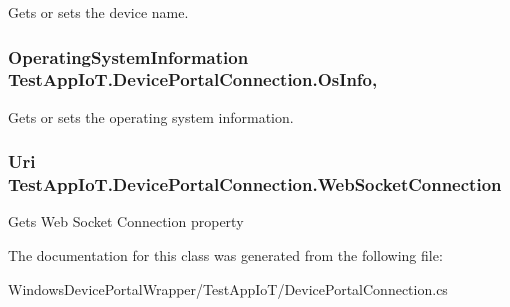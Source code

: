 Gets or sets the device name. 

\subsubsection[{\texorpdfstring{Os\+Info}{OsInfo}}]{\setlength{\rightskip}{0pt plus 5cm}Operating\+System\+Information Test\+App\+Io\+T.\+Device\+Portal\+Connection.\+Os\+Info\hspace{0.3cm}{\ttfamily [get]}, {\ttfamily [set]}}\hypertarget{class_test_app_io_t_1_1_device_portal_connection_aa4b6c78b31ecec6f4ab0097b9d309146}{}\label{class_test_app_io_t_1_1_device_portal_connection_aa4b6c78b31ecec6f4ab0097b9d309146}


Gets or sets the operating system information. 

\subsubsection[{\texorpdfstring{Web\+Socket\+Connection}{WebSocketConnection}}]{\setlength{\rightskip}{0pt plus 5cm}Uri Test\+App\+Io\+T.\+Device\+Portal\+Connection.\+Web\+Socket\+Connection\hspace{0.3cm}{\ttfamily [get]}}\hypertarget{class_test_app_io_t_1_1_device_portal_connection_aaf56f132db8c638ce61efebcb282e240}{}\label{class_test_app_io_t_1_1_device_portal_connection_aaf56f132db8c638ce61efebcb282e240}


Gets Web Socket Connection property 



The documentation for this class was generated from the following file\+:\begin{DoxyCompactItemize}
\item 
Windows\+Device\+Portal\+Wrapper/\+Test\+App\+Io\+T/Device\+Portal\+Connection.\+cs\end{DoxyCompactItemize}
